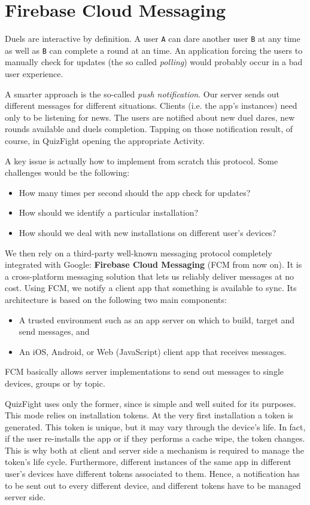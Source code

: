 \section{Firebase Cloud Messaging}

Duels are interactive by definition. A user \texttt{A} can dare another user
\texttt{B} at any time as well as \texttt{B} can complete a round at an
 time.
An application forcing the users to manually check for updates (the so
called \textit{polling}) would probably occur in a bad user experience.

A smarter approach is the so-called \textit{push notification}.
Our server sends out different messages for different situations.
Clients (i.e. the app's instances) need only to be listening for news.
The users are notified about new duel dares, new rounds available and duels
completion. Tapping on those notification result, of course, in QuizFight
opening the appropriate Activity.

A key issue is actually how to implement from scratch this protocol.
Some challenges would be the following:

\begin{itemize}
	\item How many times per second should the app check for updates?
	\item How should we identify a particular installation?
	\item How should we deal with new installations on different user's devices?
\end{itemize}

We then rely on a third-party well-known messaging protocol completely
integrated with Google: \textbf{Firebase Cloud Messaging} (FCM from now on).
It is a cross-platform messaging solution that lets us reliably deliver
messages at no cost.
Using FCM, we notify a client app that something is available to sync.
Its architecture is based on the following two main components:

\begin{itemize}
	\item A trusted environment such as an app server on which to build,
target and send messages, and
	\item An iOS, Android, or Web (JavaScript) client app that receives
messages.
\end{itemize}

FCM basically allows server implementations to send out messages to single
devices, groups or by topic.

QuizFight uses only the former, since is simple and well suited for its
purposes. This mode relies on installation tokens. At the very first
installation a token is generated.
This token is unique, but it may vary through the device's life.
In fact, if the user re-installs the app or if they performs a cache wipe,
the token changes.
This is why both at client and server side a mechanism is required to
manage the token's life cycle.
Furthermore, different instances of the same app in different user's devices
have different tokens associated to them.
Hence, a notification has to be sent out to every different device, and
different tokens have to be managed server side.


